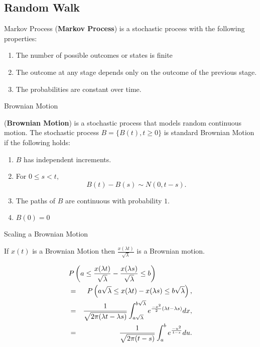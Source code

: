 \subsection{Random Walk}
%
\begin{frame}{Markov Process}
(\textbf{Markov Process}) is a stochastic process with the following properties: 
\begin{enumerate}
\item The number of possible outcomes or states is finite
\item The outcome at any stage depends only on the outcome of the previous stage.
\item The probabilities are constant over time.   
\end{enumerate}
\end{frame}


\begin{frame}{Brownian Motion}
\begin{definition}(\textbf{Brownian Motion}) is a stochastic process that models random continuous motion. The stochastic process $B=\{B(t), t\geq 0\}$ is standard Brownian Motion if the following holds:
\begin{enumerate}
\item $B$ has independent increments.
\item For $0 \leq s < t,$ $$B(t)-B(s) \sim N(0,t-s).$$
\item The paths of $B$ are continuous with probability $1$.
\item $B(0)=0$ 
\end{enumerate}
\end{definition}
\end{frame}

\begin{frame}

  \cite{doi:10.1137/S0036144500378302}
\end{frame}


\begin{frame}{Scaling a Brownian Motion}
\vfill

If $x(t)$ is a Brownian Motion then 
$\displaystyle \frac{x(\lambda t)}{\sqrt{\lambda}}$ 
is a Brownian motion.
	
\vfill
\begin{eqnarray*}
  \lefteqn{
	P \left(a \leq \frac{x(\lambda t)}{\sqrt{\lambda}}-\frac{x(\lambda s)}{\sqrt{\lambda}} \leq b \right)
	} & & \\
    & = & P \left(a \sqrt{\lambda} \leq x(\lambda t) - x (\lambda s) \leq b \sqrt{\lambda} \right), \\
	& = & \displaystyle \frac{1}{\sqrt{2 \pi (\lambda t -\lambda s)}} 
                    \int_{a \sqrt{\lambda}}^{b \sqrt{\lambda}} e^{\frac{-x^2}{2}(\lambda t- \lambda s)} dx, \\
    & = & \frac{1}{\sqrt{2 \pi (t-s)}} \int_{a}^{b} e^{\frac{-u^2}{t-s}}du.
 \end{eqnarray*}
\end{frame}

